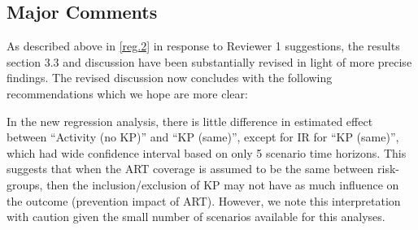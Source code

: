 \subsection{Major Comments}
\begin{comment}\label{recommend}
It's not immediately clear to me what the key recommendation is that flows from Figure 3. If I have a model with the base case (no risk heterogeneity), which compartments or dynamics should I add first better to represent the true epidemic?
\end{comment}
\begin{response}
As described above in \ref{reg.2} in response to Reviewer 1 suggestions, the results section 3.3 and discussion have been
substantially revised in light of more precise findings.
The revised discussion now concludes with the following recommendations which we hope are more clear:
\end{response}
\begin{comment}\label{risk.explain}
Further discussion of the headline finding would be welcome - that the omission of key populations but the inclusion of risk heterogeneity in the generalised population brings about the smallest declines in new HIV infections is notable. Where possible - interrogating which dynamics are most important in the discrepancy between 'Activity (no KP)' and the other three model scenarios would be of interest.
\end{comment}
\begin{response}
In the new regression analysis, there is little difference in estimated effect between ``Activity (no KP)'' and ``KP (same)'',
except for IR for ``KP (same)'', which had wide confidence interval based on only 5 scenario time horizons.
This suggests that when the ART coverage is assumed to be the same between risk-groups,
then the inclusion/exclusion of KP may not have as much influence on the outcome (prevention impact of ART).
However, we note this interpretation with caution given the small number of scenarios available for this analyses.
\end{response}
